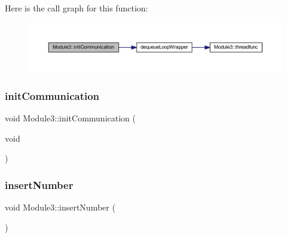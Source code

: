 Here is the call graph for this function\+:
\nopagebreak
\begin{figure}[H]
\begin{center}
\leavevmode
\includegraphics[width=350pt]{class_module3_ac66437d00aebddd32dc0618de74ea5a3_cgraph}
\end{center}
\end{figure}
\mbox{\label{class_module3_ac66437d00aebddd32dc0618de74ea5a3}} 
\subsubsection{\texorpdfstring{init\+Communication}{initCommunication}\hspace{0.1cm}{\footnotesize\ttfamily [2/2]}}
{\footnotesize\ttfamily void Module3\+::init\+Communication (\begin{DoxyParamCaption}\item[{void}]{ }\end{DoxyParamCaption})\hspace{0.3cm}{\ttfamily [slot]}}

\mbox{\label{class_module3_a2fee494b81b29cb56c1d860a5306adf2}} 
\subsubsection{\texorpdfstring{insert\+Number}{insertNumber}\hspace{0.1cm}{\footnotesize\ttfamily [1/2]}}
{\footnotesize\ttfamily void Module3\+::insert\+Number (\begin{DoxyParamCaption}{ }\end{DoxyParamCaption})\hspace{0.3cm}{\ttfamily [signal]}}

\mbox{\label{class_module3_a2fee494b81b29cb56c1d860a5306adf2}} 
